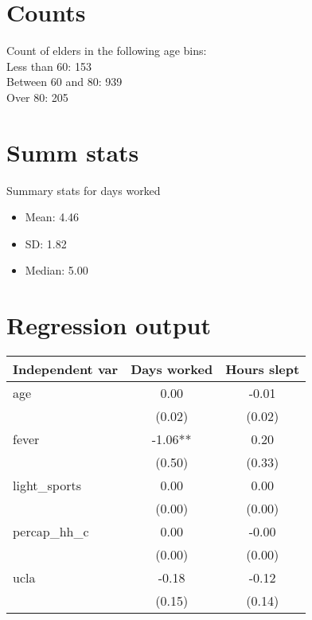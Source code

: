 \documentclass[12pt]{article}
\begin{document}
\section{Counts}
Count of elders in the following age bins:\\ 
Less than 60: 153 \\
Between 60 and 80: 939 \\
Over 80: 205 \\

\section{Summ stats}
Summary stats for days worked
\begin{itemize}
\item Mean: 4.46
\item SD: 1.82
\item Median: 5.00
\end{itemize}

\section{Regression output}
\begin{tabular}{lcc}
\hline
 \hline
 Independent var  &  Days worked & Hours slept \\
\hline
age & 0.00 & -0.01\\
& (0.02) & (0.02)\\
fever & -1.06** & 0.20\\
& (0.50) & (0.33)\\
light_sports & 0.00 & 0.00\\
& (0.00) & (0.00)\\
percap_hh_c & 0.00 & -0.00\\
& (0.00) & (0.00)\\
ucla & -0.18 & -0.12\\
& (0.15) & (0.14)\\
\hline
\hline
\end{tabular}
\end{document}
